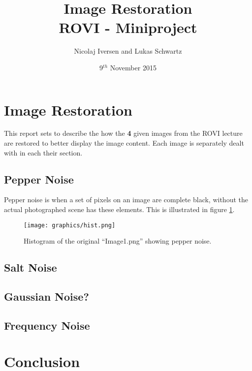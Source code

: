 \documentclass[12pt,a4paper]{article}
\begin{document}
\title{Image Restoration\\ \large{ROVI - Miniproject}}
\author{Nicolaj Iversen and Lukas Schwartz}
\date{9$^{th}$ November 2015}


\maketitle

\pagebreak




\section{Image Restoration}
This report sets to describe the how the \textbf{4} given images from the ROVI lecture are restored to better display the image content.
Each image is separately dealt with in each their section.



\subsection{Pepper Noise}
Pepper noise is when a set of pixels on an image are complete black, without the actual photographed scene has these elements.
This is illustrated in figure \ref{fig:hist_pepper}.

\begin{figure}[H]
\texttt{[image: graphics/hist.png]}
\caption{Histogram of the original ``Image1.png'' showing pepper noise.}
\label{fig:hist_pepper}
\end{figure}




\subsection{Salt Noise}


\subsection{Gaussian Noise?}


\subsection{Frequency Noise}



\section{Conclusion}
\end{document}
